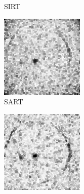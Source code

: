\documentclass{article}
\begin{document}
\begin{figure}[!h]
\begin{subfigure}[b]{0.2\linewidth}
\captionsetup{labelformat=empty}
        \caption{SIRT}
     \end{subfigure}
    \begin{subfigure}[b]{0.2\linewidth}
        \includegraphics[width=\textwidth]{../images/potato/artefacts/with_noise/weightsIm_sart30.png}
\captionsetup{labelformat=empty}
        \caption{SART}
     \end{subfigure}
    \begin{subfigure}[b]{0.2\linewidth}
        \includegraphics[width=\textwidth]{../images/potato/artefacts/with_noise/weightsIm_fbp_sirt30.png}

\end{subfigure}
\end{figure}
\end{document}
